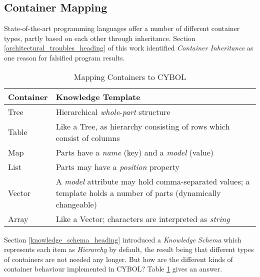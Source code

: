 %
%
%
%
%
%
%

\subsection{Container Mapping}
\label{container_mapping_heading}

State-of-the-art programming languages offer a number of different container
types, partly based on each other through inheritance. Section
\ref{architectural_troubles_heading} of this work identified
\emph{Container Inheritance} as one reason for falsified program results.

\begin{table}[ht]
    \begin{center}
        \begin{tabular}{| p{15mm} | p{35mm} |}
            \hline
            \textbf{Container} & \textbf{Knowledge Template}\\
            \hline
            Tree & Hierarchical \emph{whole}-\emph{part} structure\\
            \hline
            Table & Like a Tree, as hierarchy consisting of rows which consist of columns\\
            \hline
            Map & Parts have a \emph{name} (key) and a \emph{model} (value)\\
            \hline
            List & Parts may have a \emph{position} property\\
            \hline
            Vector & A \emph{model} attribute may hold comma-separated values;
                a template holds a number of parts (dynamically changeable)\\
            \hline
            Array & Like a Vector; characters are interpreted as \emph{string}\\
            \hline
        \end{tabular}
        \caption{Mapping Containers to CYBOL}
        \label{mapping_table}
    \end{center}
\end{table}

Section \ref{knowledge_schema_heading} introduced a \emph{Knowledge Schema}
which represents each item as \emph{Hierarchy} by default, the result being
that different types of containers are not needed any longer. But how are the
different kinds of container behaviour implemented in CYBOL? Table
\ref{mapping_table} gives an answer.
